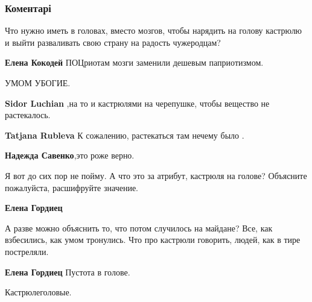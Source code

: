  
 
 
 
 
\subsubsection{Коментарі}
\label{sec:01_12_2021.fb.zhuravko_aleksej.4.den_kastrjulegolovyh.cmt}

\begin{itemize} %

Что нужно иметь в головах, вместо мозгов, чтобы нарядить на голову кастрюлю и
выйти разваливать свою страну на радость чужеродцам?

\begin{itemize} %
\textbf{Елена Кокодей} ПОЦриотам мозги заменили дешевым паприотизмом.
\end{itemize} %

УМОМ УБОГИЕ.

\begin{itemize} %
\textbf{Sidor Luchian} ,на то и кастрюлями на черепушке, чтобы вещество не растекалось.

\textbf{Tatjana Rubleva} К сожалению, растекаться там нечему было .

\textbf{Надежда Савенко},это роже верно.
\end{itemize} %


Я вот до сих пор не пойму. А что это за атрибут, кастрюля на голове? Объясните
пожалуйста, расшифруйте значение.

\begin{itemize} %
\textbf{Елена Гордиец} 

А разве можно объяснить то, что потом случилось на майдане? Все, как
взбесились, как умом тронулись. Что про кастрюли говорить, людей, как в тире
постреляли.

\textbf{Елена Гордиец} Пустота в голове.
\end{itemize} %

Кастрюлеголовые.


\end{itemize}
